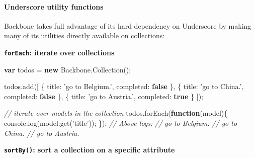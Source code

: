 \documentclass[9pt]{book}
\newenvironment{Shaded}{}{}
\newcommand{\KeywordTok}[1]{\textcolor[rgb]{0.00,0.44,0.13}{\textbf{{#1}}}}
\newcommand{\DataTypeTok}[1]{\textcolor[rgb]{0.56,0.13,0.00}{{#1}}}
\newcommand{\StringTok}[1]{\textcolor[rgb]{0.25,0.44,0.63}{{#1}}}
\newcommand{\CommentTok}[1]{\textcolor[rgb]{0.38,0.63,0.69}{\textit{{#1}}}}
\newcommand{\OtherTok}[1]{\textcolor[rgb]{0.00,0.44,0.13}{{#1}}}
\newcommand{\FunctionTok}[1]{\textcolor[rgb]{0.02,0.16,0.49}{{#1}}}
\newcommand{\NormalTok}[1]{{#1}}
\begin{document}
\paragraph{Underscore utility
functions}\label{underscore-utility-functions}

Backbone takes full advantage of its hard dependency on Underscore by
making many of its utilities directly available on collections:

\textbf{\texttt{forEach}: iterate over collections}

\begin{Shaded}
\begin{Highlighting}[]
\KeywordTok{var} \NormalTok{todos = }\KeywordTok{new} \OtherTok{Backbone}\NormalTok{.}\FunctionTok{Collection}\NormalTok{();}

\OtherTok{todos}\NormalTok{.}\FunctionTok{add}\NormalTok{([}
  \NormalTok{\{ }\DataTypeTok{title}\NormalTok{: }\StringTok{'go to Belgium.'}\NormalTok{, }\DataTypeTok{completed}\NormalTok{: }\KeywordTok{false} \NormalTok{\},}
  \NormalTok{\{ }\DataTypeTok{title}\NormalTok{: }\StringTok{'go to China.'}\NormalTok{, }\DataTypeTok{completed}\NormalTok{: }\KeywordTok{false} \NormalTok{\},}
  \NormalTok{\{ }\DataTypeTok{title}\NormalTok{: }\StringTok{'go to Austria.'}\NormalTok{, }\DataTypeTok{completed}\NormalTok{: }\KeywordTok{true} \NormalTok{\}}
\NormalTok{]);}

\CommentTok{// iterate over models in the collection}
\OtherTok{todos}\NormalTok{.}\FunctionTok{forEach}\NormalTok{(}\KeywordTok{function}\NormalTok{(model)\{}
  \OtherTok{console}\NormalTok{.}\FunctionTok{log}\NormalTok{(}\OtherTok{model}\NormalTok{.}\FunctionTok{get}\NormalTok{(}\StringTok{'title'}\NormalTok{));}
\NormalTok{\});}
\CommentTok{// Above logs:}
\CommentTok{// go to Belgium.}
\CommentTok{// go to China.}
\CommentTok{// go to Austria.}
\end{Highlighting}
\end{Shaded}

\textbf{\texttt{sortBy()}: sort a collection on a specific attribute}
\end{document}
